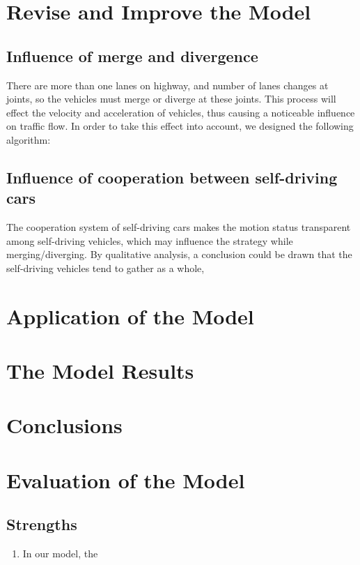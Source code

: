 \documentclass{icmmcm}
\begin{document}
\section{Revise and Improve the Model}
\subsection{Influence of merge and divergence}
There are more than one lanes on highway, and number of lanes changes at joints, so the vehicles must merge or diverge at these joints. This process will effect the velocity and acceleration of vehicles, thus causing a noticeable influence on traffic flow. In order to take this effect into account, we designed the following algorithm:\\
\subsection{Influence of cooperation between self-driving cars}
The cooperation system of self-driving cars makes the motion status transparent among self-driving vehicles, which may influence the strategy while merging/diverging. By qualitative analysis, a conclusion could be drawn that the self-driving vehicles tend to gather as a whole,
\section{Application of the Model}%
\section{The Model Results}
\subsection{}
\section{Conclusions}
\section{Evaluation of the Model}
\subsection{Strengths}
\begin{enumerate}
\item In our model, the
\end{enumerate} 
\end{document}

